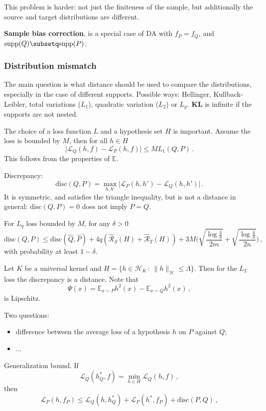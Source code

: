 \documentclass[a4paper]{article}
\newcommand{\ex}{\mathbb{E}}
\newcommand{\Hcal}{\mathcal{H}}
\begin{document}
This problem is harder: not just the finiteness of the sample, but additionally
the source and target distributions are different.

\textbf{Sample bias correction}, is a special case of DA with $f_P = f_Q$, and
$\text{supp}(Q)\subsetq \text{supp}(P)$.

\subsubsection{Distribution mismatch} %
\label{ssub:distribution_mismatch}

The main question is what distance should be used to compare the distributions,
especially in the case of different supports. Possible ways: Hellinger, Kullback-
Leibler, total variations ($L_1$), quadratic variation ($L_2$) or $L_p$.
\textbf{KL} is infinite if the supports are not nested.

The choice of a loss function $L$ and a hypothesis set $H$ is important.
Assume the loss is bounded by $M$, then for all $h\in H$
\[ \bigl| \mathcal{L}_Q(h, f) - \mathcal{L}_P(h, f) \bigr|
    \leq M L_1(Q, P)
    \,.\]
This follows from the properties of $\ex$.

Discrepancy:
\[ \text{disc}(Q,P) = \max_{h,h'} \bigl| \mathcal{L}_P(h,h') - \mathcal{L}_Q(h,h')\bigr| \,. \]
It is symmetric, and satisfies the triangle inequality, but is not a distance in
general: $\text{disc}(Q,P) = 0$ does not imply $P=Q$.

For $L_q$ loss bounded by $M$, for any $\delta>0$
\[ \text{disc}(Q,P)
    \leq \text{disc}(\hat{Q},\hat{P})
    + 4q(\hat{\mathcal{R}}_S(H) + \hat{\mathcal{R}}_T(H))
    + 3 M \biggl( \sqrt{\frac{\log\frac{4}{\delta}}{2m}}
                + \sqrt{\frac{\log\frac{4}{\delta}}{2n}} \biggr)
    \,,\]
with probability at least $1-\delta$.

Let $K$ be a universal kernel and $H = \{ h\in \Hcal_K\,:\,\|h\|_\Hcal\leq \Lambda \}$.
Then for the $L_2$ loss the discrepancy is a distance. Note that 
\[ \Psi(x) = \ex_{x\sim P} h^2(x) - \ex_{x\sim Q} h^2(x) \,, \]
is Lipschitz.

Two questions: \begin{itemize}
    \item difference between the average loss of a hypothesis $h$ on $P$ against $Q$;
    \item ...
\end{itemize}
Generalization bound. If
\[ \mathcal{L}_Q(h^*_Q, f) = \min_{h\in H} \mathcal{L}_Q(h, f) \,,\]
then
\[ \mathcal{L}_P(h, f_P)
    \leq \mathcal{L}_Q(h, h^*_Q)
    + \mathcal{L}_P(h^*, f_P)
    + \text{disc}(P,Q)
    \,, \]
\end{document}
